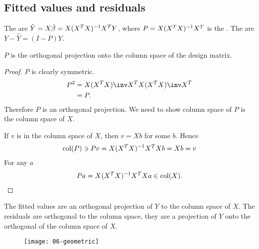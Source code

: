 \subsection{Fitted values and residuals}
\begin{definition}
	The  are $\hat Y = X \hat \beta = X(X^T X)^{-1} X^T Y$, where $P = X (X^T X)^{-1} X^T$ is the .
	The  are $Y - \hat Y = (I-P)Y$.
\end{definition}

\begin{proposition}
	$P$ is the orthogonal projection onto the column space of the design matrix.
\end{proposition}

\begin{proof}
	$P$ is clearly symmetric. \\
	\begin{align*}
		P^2 &= X (X^\tran X)\inv X^\tran X (X^\tran X)\inv X^\tran \\
		&= P.
	\end{align*}
	Therefore $P$ is an orthogonal projection.
	We need to show column space of $P$ is the column space of $X$. 

	If $v$ is in the column space of $X$, then $v = Xb$ for some $b$.
	Hence
	\begin{align*}
		\operatorname{col}(P) \ni Pv = X(X^T X)^{-1} X^T X b = Xb = v
	\end{align*}
	For any $a$ 
	\begin{align*}
		Pa = X(X^T X)^{-1} X^T X a \in \operatorname{col}(X).
	\end{align*} 
\end{proof}

\begin{corollary}
	The fitted values are an orthogonal projection of $Y$ to the column space of $X$.
	The residuals are orthogonal to the column space, they are a projection of $Y$ onto the orthogonal of the column space of $X$. 
\end{corollary}

\begin{figure}[h] 
    \centering 
    \texttt{[image: 06-geometric]} 
\end{figure}

